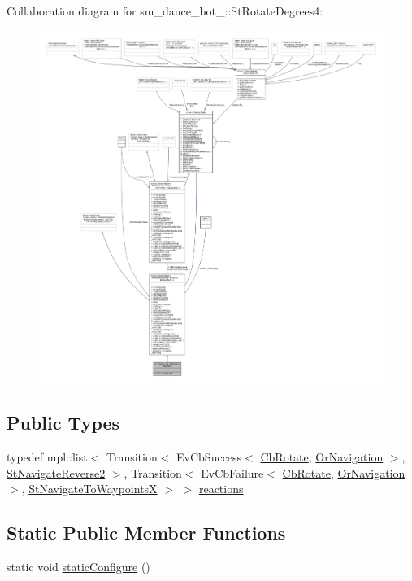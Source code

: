 Collaboration diagram for sm\+\_\+dance\+\_\+bot\+\_\+:\+:St\+Rotate\+Degrees4\+:
\nopagebreak
\begin{figure}[H]
\begin{center}
\leavevmode
\includegraphics[width=350pt]{structsm__dance__bot__2_1_1StRotateDegrees4__coll__graph}
\end{center}
\end{figure}
\subsection*{Public Types}
\begin{DoxyCompactItemize}
\item 
typedef mpl\+::list$<$ Transition$<$ Ev\+Cb\+Success$<$ \hyperlink{classcl__move__base__z_1_1CbRotate}{Cb\+Rotate}, \hyperlink{classsm__dance__bot__2_1_1OrNavigation}{Or\+Navigation} $>$, \hyperlink{structsm__dance__bot__2_1_1StNavigateReverse2}{St\+Navigate\+Reverse2} $>$, Transition$<$ Ev\+Cb\+Failure$<$ \hyperlink{classcl__move__base__z_1_1CbRotate}{Cb\+Rotate}, \hyperlink{classsm__dance__bot__2_1_1OrNavigation}{Or\+Navigation} $>$, \hyperlink{structsm__dance__bot__2_1_1StNavigateToWaypointsX}{St\+Navigate\+To\+WaypointsX} $>$ $>$ \hyperlink{structsm__dance__bot__2_1_1StRotateDegrees4_a4d99def8f8616fd8619c5cafb9f63842}{reactions}
\end{DoxyCompactItemize}
\subsection*{Static Public Member Functions}
\begin{DoxyCompactItemize}
\item 
static void \hyperlink{structsm__dance__bot__2_1_1StRotateDegrees4_a553d00b558b39dc3dfa5e670bd7ee30a}{static\+Configure} ()
\end{DoxyCompactItemize}
